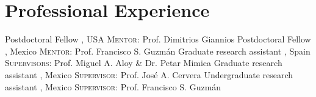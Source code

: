\section{Professional Experience}

%
{\DPA}%
{Postdoctoral Fellow}%
{}%
{\Purdue, USA}%
{\textsc{Mentor}: Prof. Dimitrios Giannios}
%
{\IFMes}%
{Postdoctoral Fellow}%
{}%
{\UMSNHes, Mexico}%
{\textsc{Mentor}: Prof. Francisco S. Guzmán}
%
{\DAAval}%
{Graduate research assistant}%
{}%
{\UVval, Spain}%
{\textsc{Supervisors}: Prof. Miguel A. Aloy \& Dr. Petar Mimica}
%
{\IFMes}%
{Graduate research assistant}%
{}%
{\UMSNHes, Mexico}%
{\textsc{Supervisor}: Prof. José A. Cervera}
%
{\FCes}%
{Undergraduate research assistant}%
{}%
{\UAEMes, Mexico}%
{\textsc{Supervisor}: Prof. Francisco S. Guzmán}
